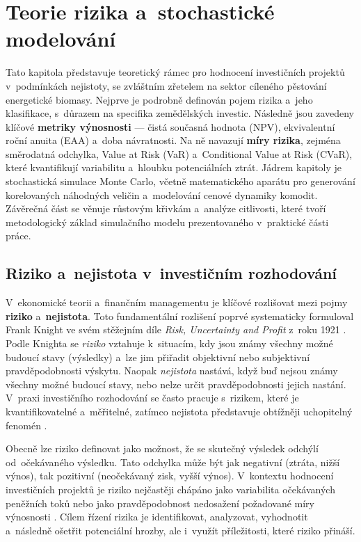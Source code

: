 \chapter{Teorie rizika a~stochastické modelování}
\label{chap:teorie-rizika-new}

Tato kapitola představuje teoretický rámec pro hodnocení investičních
projektů v~podmínkách nejistoty, se zvláštním zřetelem na sektor
cíleného pěstování energetické biomasy. Nejprve je podrobně definován
pojem rizika a~jeho klasifikace, s~důrazem na specifika zemědělských
investic. Následně jsou zavedeny klíčové \textbf{metriky výnosnosti}
--- čistá současná hodnota (NPV), ekvivalentní roční anuita (EAA)
a~doba návratnosti. Na ně navazují \textbf{míry
rizika}, zejména směrodatná odchylka, Value at Risk (VaR) a~Conditional
Value at Risk (CVaR), které kvantifikují variabilitu a~hloubku
potenciálních ztrát. Jádrem kapitoly je stochastická simulace Monte
Carlo, včetně matematického aparátu pro generování korelovaných
náhodných veličin a~modelování cenové dynamiky komodit. Závěrečná
část se věnuje růstovým křivkám a~analýze citlivosti, které tvoří
metodologický základ simulačního modelu prezentovaného v~praktické
části práce.

\section{Riziko a~nejistota v~investičním rozhodování}
\label{sec:riziko-nejistota-new}

V~ekonomické teorii a~finančním managementu je klíčové rozlišovat mezi pojmy \textbf{riziko} a~\textbf{nejistota}. Toto fundamentální rozlišení poprvé systematicky formuloval Frank Knight ve svém stěžejním díle \textit{Risk, Uncertainty and Profit} z~roku 1921 \cite{Knight1921}. Podle Knighta se \textit{riziko} vztahuje k~situacím, kdy jsou známy všechny možné budoucí stavy (výsledky) a~lze jim přiřadit objektivní nebo subjektivní pravděpodobnosti výskytu. Naopak \textit{nejistota} nastává, když buď nejsou známy všechny možné budoucí stavy, nebo nelze určit pravděpodobnosti jejich nastání. V~praxi investičního rozhodování se často pracuje s~rizikem, které je kvantifikovatelné a~měřitelné, zatímco nejistota představuje obtížněji uchopitelný fenomén \cite{FotrHnilica2009}.

Obecně lze riziko definovat jako možnost, že se skutečný výsledek 
odchýlí od~očekávaného výsledku. Tato odchylka může být jak negativní 
(ztráta, nižší výnos), tak pozitivní (neočekávaný zisk, vyšší výnos). V~kontextu hodnocení investičních projektů 
je riziko nejčastěji chápáno jako variabilita očekávaných peněžních 
toků nebo jako pravděpodobnost nedosažení požadované míry výnosnosti 
\citep{fotr_soucek_2011}. Cílem řízení rizika je 
identifikovat, analyzovat, vyhodnotit a~následně ošetřit potenciální 
hrozby, ale i~využít příležitosti, které riziko přináší.

